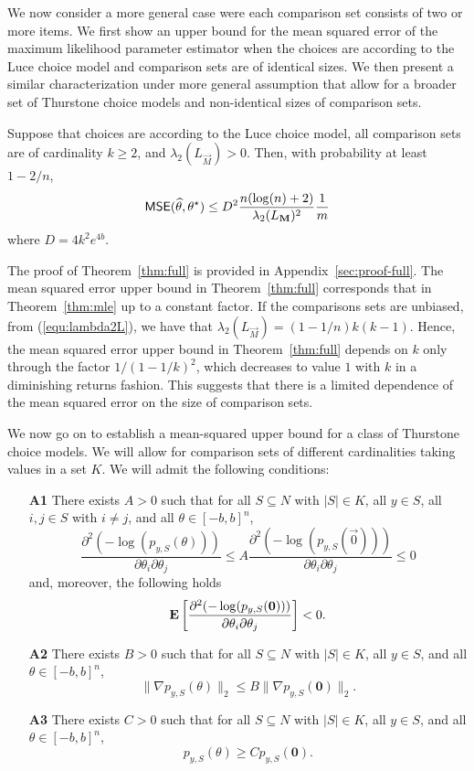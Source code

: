 We now consider a more general case were each comparison set consists of two or more items. We first show an upper bound for the mean squared error of the maximum likelihood parameter estimator when the choices are according to the Luce choice model and comparison sets are of identical sizes. We then present a similar characterization under more general assumption that allow for a broader set of Thurstone choice models and non-identical sizes of comparison sets.  

\begin{theorem} Suppose that choices are according to the Luce choice model, all comparison sets are of cardinality $k\geq 2$, and $\lambda_2(L_{\vec{M}})>0$. Then, with probability at least $1-2/n$, 
$$
\hbox{\textup{\textsf{MSE}}}(\widehat\theta, \theta^\star)
\le D^2\frac{n(\log (n)+2)}{\lambda_2(L_\mathbf{M})^2}\frac{1}{m}
$$
where $D = 4k^2e^{4b}$.
\label{thm:full}
\end{theorem}

The proof of Theorem~\ref{thm:full} is provided in Appendix~\ref{sec:proof-full}. The mean squared error upper bound in Theorem~\ref{thm:full} corresponds that in Theorem~\ref{thm:mle} up to a constant factor. If the comparisons sets are unbiased, from (\ref{equ:lambda2L}), we have that $\lambda_2(L_{\vec{M}}) = (1-1/n)k(k-1)$. Hence, the mean squared error upper bound in Theorem~\ref{thm:full} depends on $k$ only through the factor $1/(1-1/k)^2$, which decreases to value $1$ with $k$ in a diminishing returns fashion. This suggests that there is a limited dependence of the mean squared error on the size of comparison sets.  

We now go on to establish a mean-squared upper bound for a class of Thurstone choice models. We will allow for comparison sets of different cardinalities taking values in a set $K$. We will admit the following conditions: 
\begin{itemize}
\item[{\bf A1}] There exists $A > 0$ such that for all $S\subseteq N$ with $|S|\in K$, all $y\in S$, all $i,j\in S$ with $i\neq j$, and all $\theta\in [-b,b]^n$,
$$
\frac{\partial^2 (-\log(p_{y,S}(\theta)))}{\partial \theta_i \partial \theta_j} \leq A\frac{\partial^2 (-\log(p_{y,S}(\vec{0})))}{\partial \theta_i \partial \theta_j} \leq 0
$$
and, moreover, the following holds
$$
\mathbf{E}\left[\frac{\partial^2 (-\log(p_{y,S}(\mathbf{0})))}{\partial \theta_i \partial \theta_j}  \right]<0.
$$

\item[{\bf A2}] There exists $B > 0$ such that for all $S\subseteq N$ with $|S|\in K$, all $y\in S$, and all $\theta \in [-b,b]^n$,
$$
\|\nabla p_{y,S}(\theta)\|_2 \leq B \| \nabla p_{y,S}({\bm 0})\|_2.
$$
\item[{\bf A3}] There exists $C > 0$ such that for all $S\subseteq N$ with $|S|\in K$, all $y\in S$, and all $\theta \in [-b,b]^n$,
$$
p_{y,S}(\theta) \geq C p_{y,S}({\bm 0}). 
$$
\end{itemize}

